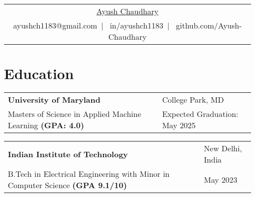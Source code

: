 \documentclass[a4paper,11pt]{article}
\begin{document}
\pagestyle{empty} 

\begin{tabularx}{\linewidth}{@{} C @{}}
\Huge{\href{https://ayush-chaudhary.github.io/}{Ayush Chaudhary}} \\[7.5pt]
ayushch1183@gmail.com\ $|$ \ 
in/ayushch1183\ $|$ \
github.com/Ayush-Chaudhary%
\end{tabularx}


\section{Education}
\begin{tabularx}{\linewidth}{@{}l X@{}}	
\textbf{University of Maryland} & \hfill College Park, MD \\
Masters of Science in Applied Machine Learning \textbf{(GPA: 4.0)} & \hfill Expected Graduation: May 2025 \\
\end{tabularx}
\begin{tabularx}{\linewidth}{@{}l X@{}}	
\textbf{Indian Institute of Technology} & \hfill New Delhi, India \\ 
B.Tech in Electrical Engineering with Minor in Computer Science \textbf{(GPA 9.1/10)}  & \hfill May 2023 \\
\end{tabularx}

\end{document}
